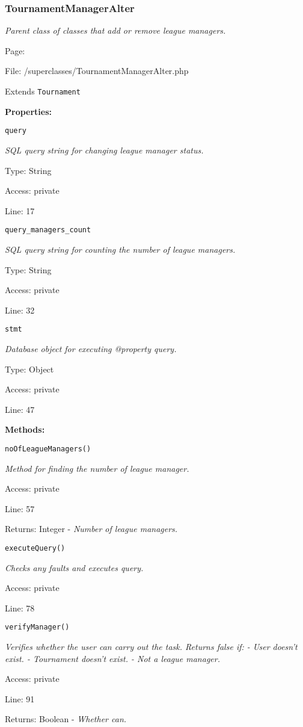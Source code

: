 \subsubsection{TournamentManagerAlter}\label{TournamentManagerAlter.php.doc}
\textit{Parent class of classes that add or remove league managers.}

Page: \pageref{TournamentManagerAlter.php}

File: /superclasses/TournamentManagerAlter.php

Extends \texttt{Tournament}

\textbf{Properties:}

\texttt{query}

{\scriptsize
\textit{SQL query string for changing league manager status.}

Type: String

Access: private

Line: 17

}
\texttt{query\_managers\_count}

{\scriptsize
\textit{SQL query string for counting the number of league managers.}

Type: String

Access: private

Line: 32

}
\texttt{stmt}

{\scriptsize
\textit{Database object for executing @property query.}

Type: Object

Access: private

Line: 47

}
\textbf{Methods:}

\texttt{noOfLeagueManagers()}

{\scriptsize
\textit{Method for finding the number of league manager.}

Access: private

Line: 57

Returns: Integer - \textit{Number of league managers.}

}

\texttt{executeQuery()}

{\scriptsize
\textit{Checks any faults and executes query.}

Access: private

Line: 78

}

\texttt{verifyManager()}

{\scriptsize
\textit{Verifies whether the user can carry out the task.
Returns false if:
- User doesn't exist.
- Tournament doesn't exist.
- Not a league manager.}

Access: private

Line: 91

Returns: Boolean - \textit{Whether can.}

}

